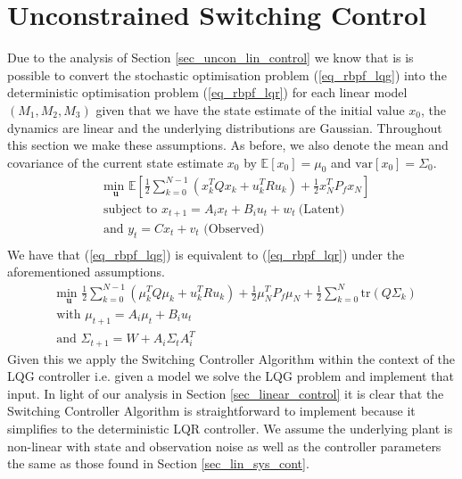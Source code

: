 \section{Unconstrained Switching Control}
\label{sec_rbpf_control_uncon}
Due to the analysis of Section \ref{sec_uncon_lin_control} we know that is is possible to convert the stochastic optimisation problem (\ref{eq_rbpf_lqg}) into the deterministic optimisation problem (\ref{eq_rbpf_lqr}) for each linear model $(M_1, M_2, M_3)$ given that we have the state estimate of the initial value $x_0$, the dynamics are linear and the underlying distributions are Gaussian. Throughout this section we make these assumptions. As before, we also denote the mean and covariance of the current state estimate $x_0$ by $\mathbb{E}[x_0]=\mu_0$ and $\text{var}[x_0]=\Sigma_0$.
\begin{equation}
\begin{aligned}
&\underset{\mathbf{u}}{\text{min }} \mathbb{E}\left[ \frac{1}{2}\sum_{k=0}^{N-1} \left( x_k^TQx_k + u_k^TRu_k \right) + \frac{1}{2}x_N^TP_fx_N \right] \\
& \text{subject to } x_{t+1}=A_ix_t+B_iu_t + w_t~\text{(Latent)} \\
& \text{and } y_{t}= Cx_t + v_t \text{ (Observed)}\\
\end{aligned}
\label{eq_rbpf_lqg}
\end{equation}
We have that (\ref{eq_rbpf_lqg}) is equivalent to (\ref{eq_rbpf_lqr}) under the aforementioned assumptions.
\begin{equation}
\begin{aligned}
&\underset{\mathbf{u}}{\text{min }} \frac{1}{2}\sum_{k=0}^{N-1} \left( \mu_k^TQ\mu_k + u_k^TRu_k \right) + \frac{1}{2}\mu_N^TP_f\mu_N + \frac{1}{2}\sum_{k=0}^N \text{tr}(Q\Sigma_k) \\
&\text{with } \mu_{t+1} = A_i\mu_t +B_iu_t \\
&\text{and } \Sigma_{t+1} = W+A_i\Sigma_t A_i^T 
\end{aligned}
\label{eq_rbpf_lqr}
\end{equation}
Given this we apply the Switching Controller Algorithm within the context of the LQG controller i.e. given a model we solve the LQG problem and implement that input. In light of our analysis in Section \ref{sec_linear_control} it is clear that the Switching Controller Algorithm is straightforward to implement because it simplifies to the deterministic LQR controller. We assume the underlying plant is non-linear with state and observation noise as well as the controller parameters the same as those found in Section \ref{sec_lin_sys_cont}.

